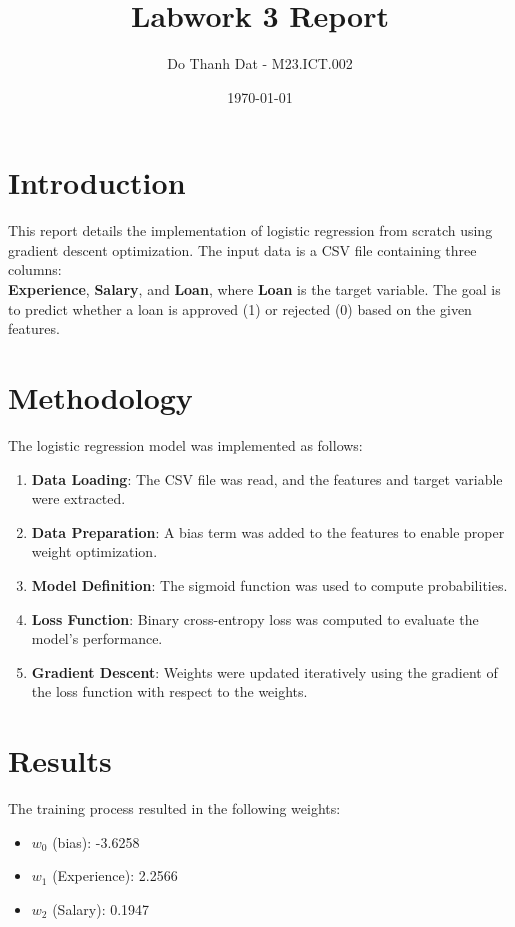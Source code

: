 \documentclass[a4paper,12pt]{article}
\title{Labwork 3 Report}
\author{Do Thanh Dat - M23.ICT.002}
\date{\today}
\begin{document}
\maketitle

\section*{Introduction}
This report details the implementation of logistic regression from scratch using gradient descent optimization. The input data is a CSV file containing three columns:\\
\textbf{Experience}, \textbf{Salary}, and \textbf{Loan}, where \textbf{Loan} is the target variable. The goal is to predict whether a loan is approved (1) or rejected (0) based on the given features.

\section*{Methodology}
The logistic regression model was implemented as follows:
\begin{enumerate}
    \item \textbf{Data Loading}: The CSV file was read, and the features and target variable were extracted.
    \item \textbf{Data Preparation}: A bias term was added to the features to enable proper weight optimization.
    \item \textbf{Model Definition}: The sigmoid function was used to compute probabilities.
    \item \textbf{Loss Function}: Binary cross-entropy loss was computed to evaluate the model's performance.
    \item \textbf{Gradient Descent}: Weights were updated iteratively using the gradient of the loss function with respect to the weights.
\end{enumerate}

\section*{Results}
The training process resulted in the following weights:
\begin{itemize}
    \item $w_0$ (bias): {-3.6258}
    \item $w_1$ (Experience): {2.2566}
    \item $w_2$ (Salary): {0.1947}
\end{itemize}
\end{document}
